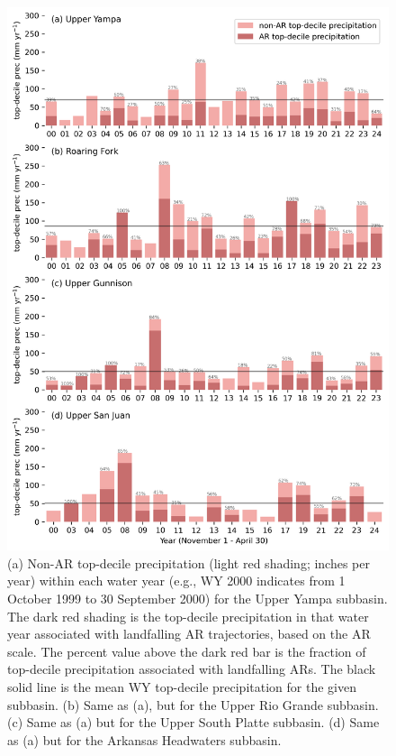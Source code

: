 \documentclass[draft]{agujournal2019}
\begin{document}
\begin{figure}
\noindent\includegraphics[width=\textwidth, height=\textheight, keepaspectratio]{fig7.png}

\caption{(a) Non-AR top-decile precipitation (light red shading; inches per year) within each water year (e.g., WY 2000 indicates from 1 October 1999 to 30 September 2000) for the Upper Yampa subbasin. The dark red shading is the top-decile precipitation in that water year associated with landfalling AR trajectories, based on the AR scale. The percent value above the dark red bar is the fraction of top-decile precipitation associated with landfalling ARs. The black solid line is the mean WY top-decile precipitation for the given subbasin. (b) Same as (a), but for the Upper Rio Grande subbasin. (c) Same as (a) but for the Upper South Platte subbasin. (d) Same as (a) but for the Arkansas Headwaters subbasin.}
\label{fig:time_series}
\end{figure}
\end{document}
